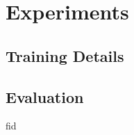 \section{Experiments}

\subsection{Training Details}

\cite{zhou2017places}

\subsection{Evaluation}

\gls{fid} \cite{heusel2017gans}
